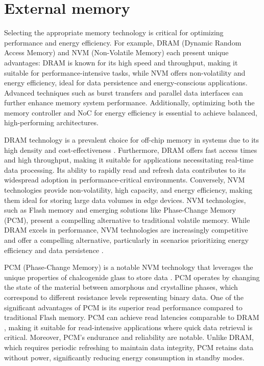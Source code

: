 \section{External memory}
Selecting the appropriate memory technology is critical for optimizing performance and energy efficiency.
For example, DRAM (Dynamic Random Access Memory) and NVM (Non-Volatile Memory) each present unique advantages: DRAM is known for its high speed and throughput, making it suitable for performance-intensive tasks, while NVM offers non-volatility and energy efficiency, ideal for data persistence and energy-conscious applications.
Advanced techniques such as burst transfers and parallel data interfaces can further enhance memory system performance.
Additionally, optimizing both the memory controller and NoC for energy efficiency is essential to achieve balanced, high-performing architectures.

DRAM technology is a prevalent choice for off-chip memory in systems due to its high density and cost-effectiveness \cite{oExploringEnergyefficientDRAM2011}.
Furthermore, DRAM offers fast access times and high throughput, making it suitable for applications necessitating real-time data processing.
Its ability to rapidly read and refresh data contributes to its widespread adoption in performance-critical environments.
Conversely, NVM technologies provide non-volatility, high capacity, and energy efficiency, making them ideal for storing large data volumes in edge devices.
NVM technologies, such as Flash memory and emerging solutions like Phase-Change Memory (PCM), present a compelling alternative to traditional volatile memory.
While DRAM excels in performance, NVM technologies are increasingly competitive and offer a compelling alternative, particularly in scenarios prioritizing energy efficiency and data persistence \cite{dulloorSystemSoftwarePersistent2014}.

PCM (Phase-Change Memory) is a notable NVM technology that leverages the unique properties of chalcogenide glass to store data \cite{meenaOverviewEmergingNonvolatile2014}.
PCM operates by changing the state of the material between amorphous and crystalline phases, which correspond to different resistance levels representing binary data.
One of the significant advantages of PCM is its superior read performance compared to traditional Flash memory.
PCM can achieve read latencies comparable to DRAM \cite{wangExploringHybridMemory2013}, making it suitable for read-intensive applications where quick data retrieval is critical.
Moreover, PCM's endurance and reliability are notable.
Unlike DRAM, which requires periodic refreshing to maintain data integrity, PCM retains data without power, significantly reducing energy consumption in standby modes.

